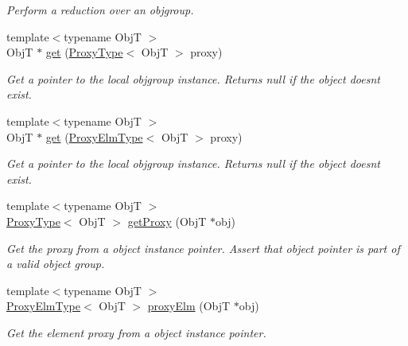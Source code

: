 \begin{DoxyCompactItemize}
\begin{DoxyCompactList}\small\item\em Perform a reduction over an objgroup. \end{DoxyCompactList}\item 
{\footnotesize template$<$typename ObjT $>$ }\\ObjT $\ast$ \hyperlink{structvt_1_1objgroup_1_1_obj_group_manager_a4b11402fc31ca40e1dd2eacb65101e2b}{get} (\hyperlink{structvt_1_1objgroup_1_1_obj_group_manager_aea65eef52f240a52210132eef5ce591f}{Proxy\+Type}$<$ ObjT $>$ proxy)
\begin{DoxyCompactList}\small\item\em Get a pointer to the local objgroup instance. Returns null if the object doesn\textquotesingle{}t exist. \end{DoxyCompactList}\item 
{\footnotesize template$<$typename ObjT $>$ }\\ObjT $\ast$ \hyperlink{structvt_1_1objgroup_1_1_obj_group_manager_a70e5e1d0ada31d6f88a8ec88965df895}{get} (\hyperlink{structvt_1_1objgroup_1_1_obj_group_manager_adba6c8ecb0f4c30e719f1abb995cfc9b}{Proxy\+Elm\+Type}$<$ ObjT $>$ proxy)
\begin{DoxyCompactList}\small\item\em Get a pointer to the local objgroup instance. Returns null if the object doesn\textquotesingle{}t exist. \end{DoxyCompactList}\item 
{\footnotesize template$<$typename ObjT $>$ }\\\hyperlink{structvt_1_1objgroup_1_1_obj_group_manager_aea65eef52f240a52210132eef5ce591f}{Proxy\+Type}$<$ ObjT $>$ \hyperlink{structvt_1_1objgroup_1_1_obj_group_manager_a9758d68a4656e7ff2eb1ac07b4feeeed}{get\+Proxy} (ObjT $\ast$obj)
\begin{DoxyCompactList}\small\item\em Get the proxy from a object instance pointer. Assert that object pointer is part of a valid object group. \end{DoxyCompactList}\item 
{\footnotesize template$<$typename ObjT $>$ }\\\hyperlink{structvt_1_1objgroup_1_1_obj_group_manager_adba6c8ecb0f4c30e719f1abb995cfc9b}{Proxy\+Elm\+Type}$<$ ObjT $>$ \hyperlink{structvt_1_1objgroup_1_1_obj_group_manager_a31f00bd509986001e3154af24239f24d}{proxy\+Elm} (ObjT $\ast$obj)
\begin{DoxyCompactList}\small\item\em Get the element proxy from a object instance pointer. \end{DoxyCompactList}\item 

\end{DoxyCompactItemize}
